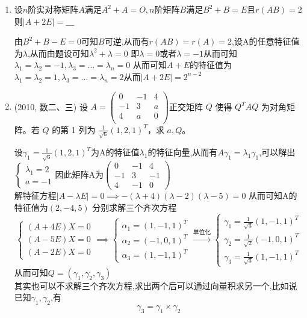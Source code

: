 \documentclass[12pt, a4paper, oneside, UTF8]{ctexbook}
\begin{document}
\begin{enumerate}
    \item 设$n$阶实对称矩阵$A$满足$A^2+A=O,n$阶矩阵$B$满足$B^2+B=E$且$r(AB)=2$则$\left|A+2E\right|=\_\_\_$
    
    \begin{solution}
    由$B^2+B-E=0$可知$B$可逆,从而有$r(AB)=r(A)=2$,设A的任意特征值为$\lambda$,从而由题设可知$\lambda^2+\lambda=0$
    即$\lambda=0$或者$\lambda=-1$从而可知$\lambda_1=\lambda_2=-1,\lambda_3=\ldots=\lambda_n=0$ 从而可知$A+E$的特征值为 
    $\lambda_1=\lambda_2=1,\lambda_3=\ldots=\lambda_n=2$从而$\left|A+2E\right|=2^{n-2}$
    \end{solution}

    \item (2010, 数二、三) 设
    $
    A = \begin{pmatrix}
    0 & -1 & 4 \\
    -1 & 3 & a  \\
    4 & a & 0  \\
    \end{pmatrix}
    $正交矩阵 $Q$ 使得 $Q^T A Q$ 为对角矩阵。若 $Q$ 的第 1 列为 
    $\frac{1}{\sqrt{6}}(1,2,1)^T$，求 $a, Q$。
    
    \begin{solution}
    设$\gamma_1=\frac{1}{\sqrt{6}}(1,2,1)^T$为A的特征值$\lambda_1$的特征向量,从而有$A\gamma_1=\lambda_1\gamma_1$,可以解出$\begin{cases}
        \lambda_1=2\\
        a=-1
    \end{cases}$因此矩阵A为$\begin{pmatrix}
        0 & -1 & 4 \\
        -1 & 3 & -1 \\
        4 & -1 & 0
    \end{pmatrix}$ \\
    解特征方程$\left|A-\lambda E\right|=0\implies -(\lambda+4)(\lambda-2)(\lambda-5)=0$ 从而可知A的特征值为$(2,-4,5)$
    分别求解三个齐次方程
    $$\begin{cases}
        (A+4E)X=0 \\
        (A-5E)X=0 \\
        (A-2E)X=0 
    \end{cases} \implies \begin{cases}
        \alpha_1 = (1,-1,1)^T \\
        \alpha_2 = (-1,0,1)^T \\
        \alpha_3 = (1,-1,1)^T
    \end{cases} \xrightarrow{\text{单位化}} \begin{cases}
        \gamma_1 = \frac{1}{\sqrt{3}}(1,-1,1)^T \\
        \gamma_2 = \frac{1}{\sqrt{2}}(-1,0,1)^T \\
        \gamma_3 = \frac{1}{\sqrt{3}}(1,-1,1)^T
    \end{cases}
    $$
    从而可知$Q=(\gamma_1,\gamma_2,\gamma_3)$ \\
    其实也可以不求解三个齐次方程,求出两个后可以通过向量积求另一个,比如说已知$\gamma_1,\gamma_2$,有
    $$
    \gamma_3=\gamma_1\times\gamma_2
    $$
    \end{solution}
    

\end{enumerate}
\end{document}

